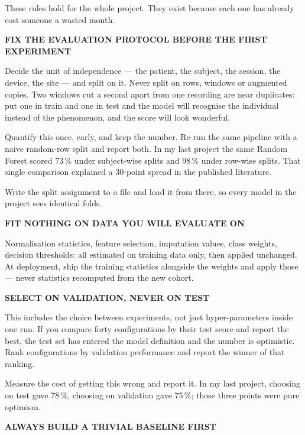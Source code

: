 \documentclass[11pt,a4paper]{article}
\begin{document}
\begin{promptbox}
\small
These rules hold for the whole project. They exist because each one has already
cost someone a wasted month.

\vspace{3pt}\textbf{FIX THE EVALUATION PROTOCOL BEFORE THE FIRST EXPERIMENT}

Decide the unit of independence --- the patient, the subject, the session, the
device, the site --- and split on it. Never split on rows, windows or augmented
copies. Two windows cut a second apart from one recording are near duplicates:
put one in train and one in test and the model will recognise the individual
instead of the phenomenon, and the score will look wonderful.

Quantify this once, early, and keep the number. Re-run the same pipeline with a
naive random-row split and report both. In my last project the same Random
Forest scored 73\,\% under subject-wise splits and 98\,\% under row-wise splits.
That single comparison explained a 30-point spread in the published literature.

Write the split assignment to a file and load it from there, so every model in
the project sees identical folds.

\vspace{3pt}\textbf{FIT NOTHING ON DATA YOU WILL EVALUATE ON}

Normalisation statistics, feature selection, imputation values, class weights,
decision thresholds: all estimated on training data only, then applied
unchanged. At deployment, ship the training statistics alongside the weights and
apply those --- never statistics recomputed from the new cohort.

\vspace{3pt}\textbf{SELECT ON VALIDATION, NEVER ON TEST}

This includes the choice between experiments, not just hyper-parameters inside
one run. If you compare forty configurations by their test score and report the
best, the test set has entered the model definition and the number is
optimistic. Rank configurations by validation performance and report the winner
of that ranking.

Measure the cost of getting this wrong and report it. In my last project,
choosing on test gave 78\,\%, choosing on validation gave 75\,\%; those three
points were pure optimism.

\vspace{3pt}\textbf{ALWAYS BUILD A TRIVIAL BASELINE FIRST}


\end{promptbox}
\end{document}
